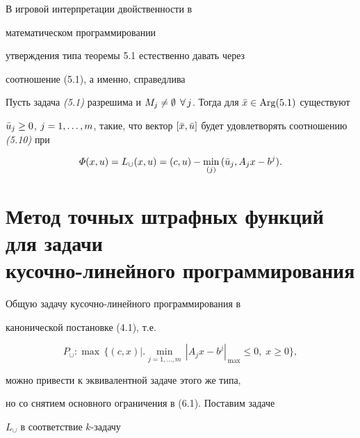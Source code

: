 В игровой интерпретации двойственности в


математическом программировании 


утверждения типа теоремы 5.1 естественно давать через


соотношение (5.1), а именно, справедлива





\begin{thms}


Пусть задача {\em (5.1)} разрешима и $M_j \ne \emp$ $\fo\,


j$. Тогда для $\Bar{x} \in \Arg (5.1)$ существуют


$\Bar{u}_j \ge 0$, $j=\ij{m}$, такие, что вектор $[ \Bar{x},


\Bar{u} ]$ будет удовлетворять соотношению {\em (5.10)} при


$$


\varPhi (x, u) = L_{\cup} (x, u) = (c, u) - \min_{(j)}\,


(\Bar{u}_j, A_j x - b^j).


$$


\end{thms}





\section{Метод точных штрафных функций для задачи\protect\\


кусочно-линейного программирования}





Общую задачу кусочно-линейного программирования в


канонической постановке (4.1), т.е.


\begin{equation}


P_{\cup}: \max\, \{ (c, x) \bigl|{}\bigr. \min_{j=1,\dotsc,m}\,


|A_j x -b^j|_{\,\max} \le 0,\; x \ge 0 \},


\end{equation}


можно привести к эквивалентной задаче этого же типа,


но со снятием основного ограничения в (6.1). Поставим задаче


$L_{\cup}$ в соответствие $k$-задачу


